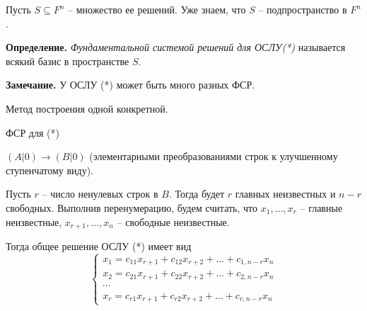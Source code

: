 Пусть $S \subseteq F^n$ -- множество ее решений. Уже знаем, что $S$ -- подпространство в $F^n$.

\vspace{\baselineskip}
\textbf{Определение.} \textit{Фундаментальной системой решений для ОСЛУ(*)} называется всякий базис в пространстве $S$.

\vspace{\baselineskip}
\textbf{Замечание.} У ОСЛУ (*) может быть много разных ФСР.

Метод построения одной конкретной.

ФСР для (*)

$(A|0) \rightarrow (B|0)$ (элементарными преобразованиями строк к улучшенному ступенчатому виду).

Пусть $r$ -- число ненулевых строк в $B$. Тогда будет $r$ главных неизвестных и $n-r$ свободных. Выполнив перенумерацию, будем считать, что $x_1, \dots, x_r$ -- главные неизвестные, $x_{r+1}, \dots, x_n$ -- свободные неизвестные.

Тогда общее решение ОСЛУ (*) имеет вид
\begin{equation*}
\begin{cases}
x_1 = c_{11} x_{r+1} + c_{12} x_{r+2} + \dots + c_{1, n-r} x_n \\
x_2 = c_{21} x_{r+1} + c_{22} x_{r+2} + \dots + c_{2, n-r} x_n \\
\cdots \\
x_r = c_{r1} x_{r+1} + c_{r2} x_{r+2} + \dots + c_{r, n-r} x_n
\end{cases}
\end{equation*}

